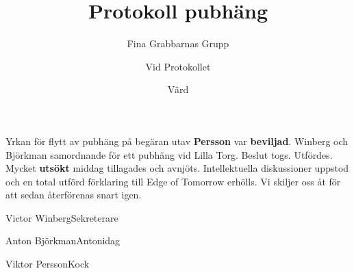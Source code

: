 \documentclass{fgg}
\title{Protokoll pubhäng}
\author{Fina Grabbarnas Grupp}
\date{\formatdate{8}{8}{2019}}
\begin{document}
\makehf
\maketitle

\begin{narvaro}
\end{narvaro}

\begin{protokoll}
	Yrkan för flytt av pubhäng på begäran utav \textbf{Persson} var \textbf{beviljad}.
	Winberg och Björkman samordnande för ett pubhäng vid Lilla Torg.
	Beslut togs.
	Utfördes.
	Mycket \textbf{utsökt} middag tillagades och avnjöts. Intellektuella diskussioner uppstod och en total utförd förklaring till Edge of Tomorrow erhölls.
	Vi skiljer oss åt för att sedan återförenas snart igen.
\end{protokoll}

\signature{Vid Protokollet}{Victor Winberg}{Sekreterare}
\signature{}{Anton Björkman}{Antonidag}
\signature{Värd}{Viktor Persson}{Kock}
\end{document}
